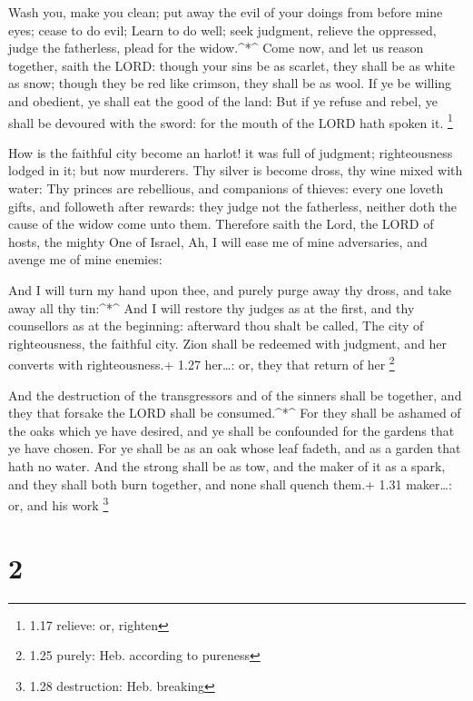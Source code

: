 Wash you, make you clean; put away the evil of your doings
from before mine eyes; cease to do evil;  Learn to do well;
seek judgment, relieve the oppressed, judge the fatherless, plead for
the widow.\^{}*\^{}  Come now, and let us reason together,
saith the LORD: though your sins be as scarlet, they shall be as white
as snow; though they be red like crimson, they shall be as wool.
 If ye be willing and obedient, ye shall eat the good of
the land:  But if ye refuse and rebel, ye shall be devoured
with the sword: for the mouth of the LORD hath spoken it. \footnote{1.17
  relieve: or, righten}

 How is the faithful city become an harlot! it was full of
judgment; righteousness lodged in it; but now murderers. 
Thy silver is become dross, thy wine mixed with water:  Thy
princes are rebellious, and companions of thieves: every one loveth
gifts, and followeth after rewards: they judge not the fatherless,
neither doth the cause of the widow come unto them. 
Therefore saith the Lord, the LORD of hosts, the mighty One of Israel,
Ah, I will ease me of mine adversaries, and avenge me of mine enemies:

 And I will turn my hand upon thee, and purely purge away
thy dross, and take away all thy tin:\^{}*\^{}  And I will
restore thy judges as at the first, and thy counsellors as at the
beginning: afterward thou shalt be called, The city of righteousness,
the faithful city.  Zion shall be redeemed with judgment,
and her converts with righteousness.+ 1.27 her\ldots: or, they that
return of her \footnote{1.25 purely: Heb. according to pureness}

 And the destruction of the transgressors and of the
sinners shall be together, and they that forsake the LORD shall be
consumed.\^{}*\^{}  For they shall be ashamed of the oaks
which ye have desired, and ye shall be confounded for the gardens that
ye have chosen.  For ye shall be as an oak whose leaf
fadeth, and as a garden that hath no water.  And the strong
shall be as tow, and the maker of it as a spark, and they shall both
burn together, and none shall quench them.+ 1.31 maker\ldots: or, and
his work \footnote{1.28 destruction: Heb. breaking}

\hypertarget{section-1}{%
\section{2}\label{section-1}}

